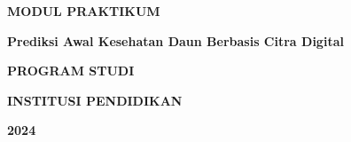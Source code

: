 \begin{titlepage}
    \centering
    \vspace*{2cm}
    
    {\Huge \textbf{MODUL PRAKTIKUM}\par}
    \vspace{1.5cm}
    
    {\Large \textbf{Prediksi Awal Kesehatan Daun Berbasis Citra Digital}\par}
    \vspace{2cm}
    
    {\large \textbf{PROGRAM STUDI}\par}
    {\large \textbf{INSTITUSI PENDIDIKAN}\par}
    {\large \textbf{2024}\par} %
\end{titlepage}
